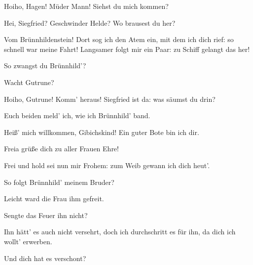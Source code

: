 \begin{drama}
\Siegfriedspeaks

Hoiho, Hagen! Müder Mann!
Siehst du mich kommen?
 

\Hagenspeaks



Hei, Siegfried?
Geschwinder Helde?
Wo brausest du her?
 

\Siegfriedspeaks

Vom Brünnhildenstein!
Dort sog ich den Atem ein,
mit dem ich dich rief:
so schnell war meine Fahrt!
Langsamer folgt mir ein Paar:
zu Schiff gelangt das her!
 

\Hagenspeaks

So zwangst du Brünnhild'?
 

\Siegfriedspeaks

Wacht Gutrune?
 

\Hagenspeaks



Hoiho, Gutrune! Komm' heraus!
Siegfried ist da:
was säumst du drin?
 

\Siegfriedspeaks



Euch beiden meld' ich,
wie ich Brünnhild' band.
 




\Siegfriedspeaks

Heiß' mich willkommen, Gibichskind!
Ein guter Bote bin ich dir.
 

\Gutrunespeaks

Freia grüße dich zu aller Frauen Ehre!
 

\Siegfriedspeaks

Frei und hold sei nun mir Frohem:
zum Weib gewann ich dich heut'.
 

\Gutrunespeaks

So folgt Brünnhild' meinem Bruder?
 

\Siegfriedspeaks

Leicht ward die Frau ihm gefreit.
 

\Gutrunespeaks

Sengte das Feuer ihn nicht?
 

\Siegfriedspeaks

Ihn hätt' es auch nicht versehrt,
doch ich durchschritt es für ihn,
da dich ich wollt' erwerben.
 

\Gutrunespeaks

Und dich hat es verschont?
 


\end{drama}
